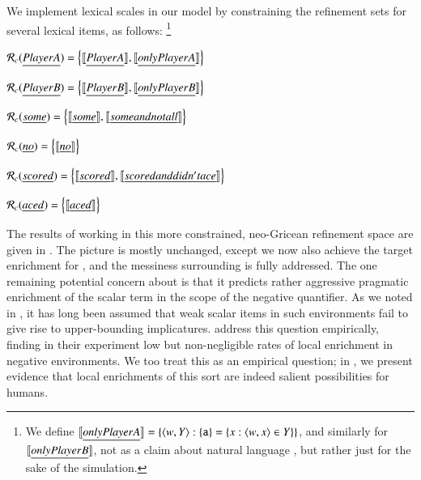 \documentclass[leqno,12pt]{article}
\begin{document}
We implement lexical scales in our model by constraining the refinement sets for
several lexical items, as follows:%
\footnote{We define $\llbracket\emph{only Player A}\rrbracket = \left\{ \langle w, Y \rangle : \left\{ \texttt{a} \right\} = \left\{ x : \langle w,x \rangle \in Y \right\} \right\}$,
  and similarly for $\llbracket\emph{only Player B}\rrbracket$, not as a claim about natural language , but rather just 
  for the sake of the simulation.}
%
\begin{examples}
\item\label{neo}
  \begin{examples}
  \item $\mathcal{R}_{c}(\emph{Player A}) = \left\{ \llbracket\emph{Player A}\rrbracket, \llbracket\emph{only Player A}\rrbracket \right\}$
  \item $\mathcal{R}_{c}(\emph{Player B}) = \left\{ \llbracket\emph{Player B}\rrbracket, \llbracket\emph{only Player B}\rrbracket \right\}$
  \item $\mathcal{R}_{c}(\emph{some}) = \left\{ \llbracket\emph{some}\rrbracket, \llbracket\emph{some and not all}\rrbracket \right\}$
  \item $\mathcal{R}_{c}(\emph{no}) = \left\{ \llbracket\emph{no}\rrbracket \right\}$    
  \item $\mathcal{R}_{c}(\emph{scored}) = \left\{ \llbracket\emph{scored}\rrbracket, \llbracket\emph{scored and didn't ace}\rrbracket \right\}$
  \item $\mathcal{R}_{c}(\emph{aced}) = \left\{ \llbracket\emph{aced}\rrbracket \right\}$
  \end{examples}
\end{examples}
%
The results of working in this more constrained, neo-Gricean
refinement space are given in . The
picture is mostly unchanged, except we now also achieve the target
enrichment for , and the messiness
surrounding  is fully addressed. The one
remaining potential concern about  is
that it predicts rather aggressive pragmatic enrichment of the scalar
term in the scope of the negative quantifier. As we noted in
, it has long been assumed that weak scalar
items in such environments fail to give rise to upper-bounding
implicatures. \citet{Chemla:Spector:2011} address this question
empirically, finding in their experiment low but non-negligible rates
of local enrichment in negative environments. We too treat this as an
empirical question; in , we present evidence that
local enrichments of this sort are indeed salient possibilities for
humans.
\end{document}
